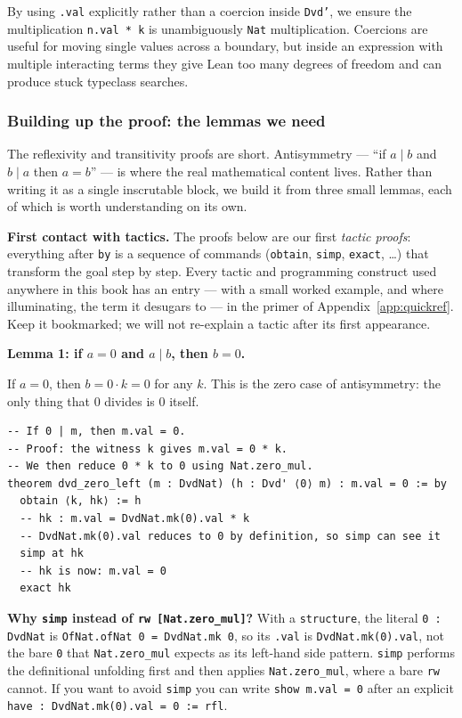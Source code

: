 \documentclass[12pt, a4paper, openright]{book}
\theoremstyle{thmstyle}
\theoremstyle{defstyle}
\newcommand{\lc}[1]{\texttt{#1}}
\newenvironment{notebox}{%
  \begin{tcolorbox}[notebox]%
}{\end{tcolorbox}}
\begin{document}
By using \lc{.val} explicitly rather than a coercion inside \lc{Dvd'}, we
ensure the multiplication \lc{n.val * k} is unambiguously \lc{Nat} multiplication.
Coercions are useful for moving single values across a boundary, but inside an
expression with multiple interacting terms they give Lean too many degrees of
freedom and can produce stuck typeclass searches.

\subsubsection{Building up the proof: the lemmas we need}

The reflexivity and transitivity proofs are short. Antisymmetry --- ``if $a
\mid b$ and $b \mid a$ then $a = b$'' --- is where the real mathematical content
lives. Rather than writing it as a single inscrutable block, we build it from
three small lemmas, each of which is worth understanding on its own.

\begin{notebox}
  \textbf{First contact with tactics.}
  The proofs below are our first \emph{tactic proofs}: everything after
  \lc{by} is a sequence of commands (\lc{obtain}, \lc{simp}, \lc{exact},
  \ldots) that transform the goal step by step. Every tactic and
  programming construct used anywhere in this book has an entry --- with a
  small worked example, and where illuminating, the term it desugars to ---
  in the primer of Appendix~\ref{app:quickref}. Keep it bookmarked; we will
  not re-explain a tactic after its first appearance.
\end{notebox}

\medskip
\textbf{Lemma 1: if $a = 0$ and $a \mid b$, then $b = 0$.}

If $a = 0$, then $b = 0 \cdot k = 0$ for any $k$. This is the zero case of
antisymmetry: the only thing that $0$ divides is $0$ itself.

\begin{verbatim}
-- If 0 | m, then m.val = 0.
-- Proof: the witness k gives m.val = 0 * k.
-- We then reduce 0 * k to 0 using Nat.zero_mul.
theorem dvd_zero_left (m : DvdNat) (h : Dvd' ⟨0⟩ m) : m.val = 0 := by
  obtain ⟨k, hk⟩ := h
  -- hk : m.val = DvdNat.mk(0).val * k
  -- DvdNat.mk(0).val reduces to 0 by definition, so simp can see it
  simp at hk
  -- hk is now: m.val = 0
  exact hk
\end{verbatim}

\begin{notebox}
  \textbf{Why \lc{simp} instead of \lc{rw [Nat.zero\_mul]}?}
  With a \lc{structure}, the literal \lc{0 : DvdNat} is
  \lc{OfNat.ofNat 0 = DvdNat.mk 0}, so its \lc{.val} is
  \lc{DvdNat.mk(0).val}, not the bare \lc{0} that \lc{Nat.zero\_mul} expects
  as its left-hand side pattern. \lc{simp} performs the definitional unfolding
  first and then applies \lc{Nat.zero\_mul}, where a bare \lc{rw} cannot.
  If you want to avoid \lc{simp} you can write \lc{show m.val = 0} after an
  explicit \lc{have : DvdNat.mk(0).val = 0 := rfl}.
\end{notebox}
\end{document}
